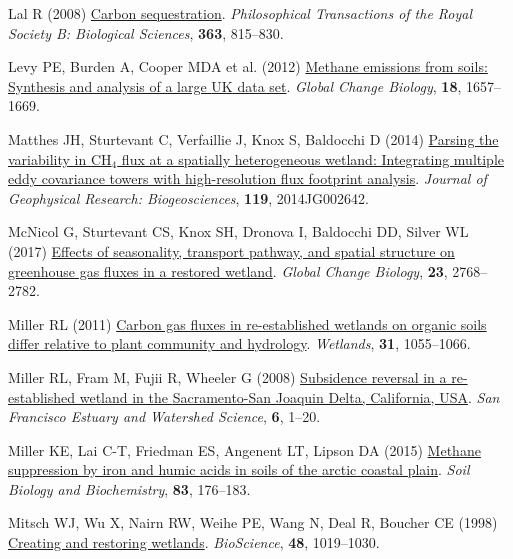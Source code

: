 \documentclass[
  12pt,
]{article}
\newlength{\cslhangindent}
\newenvironment{CSLReferences}[2] %
 {\begin{list}{}{%
  \setlength{\itemindent}{0pt}
  \setlength{\leftmargin}{0pt}
  \setlength{\parsep}{0pt}
  \ifodd #1
   \setlength{\leftmargin}{\cslhangindent}
   \setlength{\itemindent}{-1\cslhangindent}
  \fi
  \setlength{\itemsep}{#2\baselineskip}}}
 {\end{list}}
\begin{document}
\begin{CSLReferences}{1}{0}
Lal R (2008) \href{https://doi.org/10.1098/rstb.2007.2185}{Carbon
sequestration}. \emph{Philosophical Transactions of the Royal Society B:
Biological Sciences}, \textbf{363}, 815--830.

Levy PE, Burden A, Cooper MDA et al. (2012)
\href{https://doi.org/10.1111/j.1365-2486.2011.02616.x}{Methane
emissions from soils: Synthesis and analysis of a large {UK} data set}.
\emph{Global Change Biology}, \textbf{18}, 1657--1669.

Matthes JH, Sturtevant C, Verfaillie J, Knox S, Baldocchi D (2014)
\href{https://doi.org/10.1002/2014JG002642}{Parsing the variability in
{CH}\(_4\) flux at a spatially heterogeneous wetland: Integrating
multiple eddy covariance towers with high-resolution flux footprint
analysis}. \emph{Journal of Geophysical Research: Biogeosciences},
\textbf{119}, 2014JG002642.

McNicol G, Sturtevant CS, Knox SH, Dronova I, Baldocchi DD, Silver WL
(2017) \href{https://doi.org/10.1111/gcb.13580}{Effects of seasonality,
transport pathway, and spatial structure on greenhouse gas fluxes in a
restored wetland}. \emph{Global Change Biology}, \textbf{23},
2768--2782.

Miller RL (2011) \href{https://doi.org/10.1007/s13157-011-0215-2}{Carbon
gas fluxes in re-established wetlands on organic soils differ relative
to plant community and hydrology}. \emph{Wetlands}, \textbf{31},
1055--1066.

Miller RL, Fram M, Fujii R, Wheeler G (2008)
\href{https://escholarship.org/uc/item/5j76502x}{Subsidence reversal in
a re-established wetland in the {Sacramento-San Joaquin Delta,
California, USA}}. \emph{San Francisco Estuary and Watershed Science},
\textbf{6}, 1--20.

Miller KE, Lai C-T, Friedman ES, Angenent LT, Lipson DA (2015)
\href{https://doi.org/10.1016/j.soilbio.2015.01.022}{Methane suppression
by iron and humic acids in soils of the arctic coastal plain}.
\emph{Soil Biology and Biochemistry}, \textbf{83}, 176--183.

Mitsch WJ, Wu X, Nairn RW, Weihe PE, Wang N, Deal R, Boucher CE (1998)
\href{https://doi.org/10.2307/1313458}{Creating and restoring wetlands}.
\emph{{BioScience}}, \textbf{48}, 1019--1030.


\end{CSLReferences}
\end{document}
